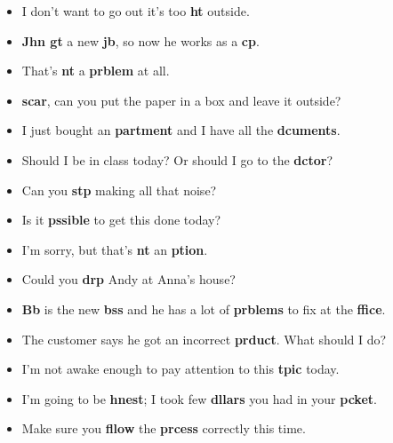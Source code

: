   
  \begin{itemize}
    \item I don't want to go out it's too \textbf{ht} outside.
    \item \textbf{Jhn gt} a new \textbf{jb}, so now he works as a \textbf{cp}.
    \item That's \textbf{nt} a \textbf{prblem} at all.
    \item \textbf{scar}, can you put the paper in a box and leave it outside?
    \item I just bought an \textbf{partment} and I have all the \textbf{dcuments}.
    \item Should I be in class today? Or should I go to the \textbf{dctor}?
    \item Can you \textbf{stp} making all that noise?
    \item Is it \textbf{pssible} to get this done today?
    \item I'm sorry, but that's \textbf{nt} an \textbf{ption}.
    \item Could you \textbf{drp} Andy at Anna's house?
    \item \textbf{Bb} is the new \textbf{bss} and he has a lot of \textbf{prblems} to fix at the \textbf{ffice}.
    \item The customer says he got an incorrect \textbf{prduct}. What should I do?
    \item I'm not awake enough to pay attention to this \textbf{tpic} today.
    \item I'm going to be \textbf{hnest}; I took few \textbf{dllars} you had in your \textbf{pcket}.
    \item Make sure you \textbf{fllow} the \textbf{prcess} correctly this time.
  \end{itemize}

  \newpage